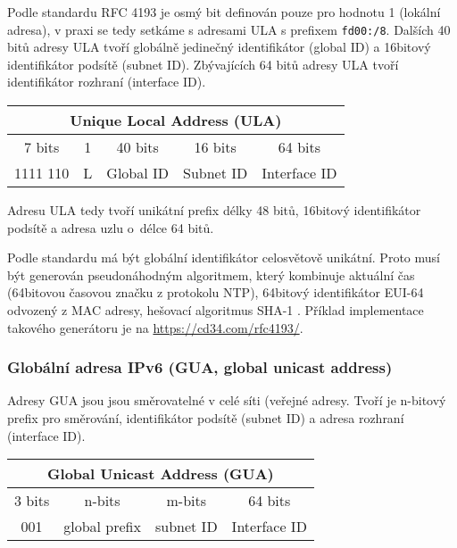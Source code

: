  Podle standardu RFC 4193 \cite{rfc4193} je osmý bit definován pouze pro hodnotu 1 (lokální adresa), v praxi se tedy setkáme s adresami ULA s prefixem {\tt fd00:/8}. Dalších 40 bitů adresy ULA tvoří globálně jedinečný identifikátor (global ID) a 16bitový identifikátor podsítě (subnet ID). Zbývajících 64 bitů adresy ULA tvoří identifikátor rozhraní (interface ID).

\begin{table}[h]
  \begin{center}
    \begin{tabular}{|c|c|c|c|c|}
      \multicolumn{5}{c}{Unique Local Address (ULA)}\\
      \hline
      7 bits & 1 &  40 bits  &  16 bits  & 64 bits \\
      \hline
      1111 110 & L & Global ID & Subnet ID & Interface ID \\
      \hline
    \end{tabular}
  \end{center}
\end{table}
Adresu ULA tedy tvoří unikátní prefix délky 48 bitů, 16bitový identifikátor podsítě a  adresa uzlu o~délce 64 bitů.

  Podle standardu má být globální identifikátor celosvětově unikátní. Proto musí být generován pseudonáhodným algoritmem, který kombinuje aktuální čas (64bitovou časovou značku z protokolu NTP), 64bitový identifikátor EUI-64 odvozený z MAC adresy, hešovací algoritmus SHA-1 \cite{rfc4193}. Příklad implementace takového generátoru je na \url{https://cd34.com/rfc4193/}.

  \subsubsection{Globální adresa IPv6 (GUA, global unicast address)}
Adresy GUA jsou jsou směrovatelné v celé síti (veřejné adresy. Tvoří je n-bitový prefix pro směrování, identifikátor podsítě (subnet ID) a adresa rozhraní (interface ID). 

\begin{table}[h]
  \begin{center}
    \begin{tabular}{|c|c|c|c|}
        \multicolumn{4}{c}{Global Unicast Address (GUA)}\\
        \hline
        3 bits & n-bits & m-bits & 64 bits \\
        \hline
        001 & global prefix & subnet ID & Interface ID \\
        \hline
    \end{tabular}
  \end{center}
\end{table}

